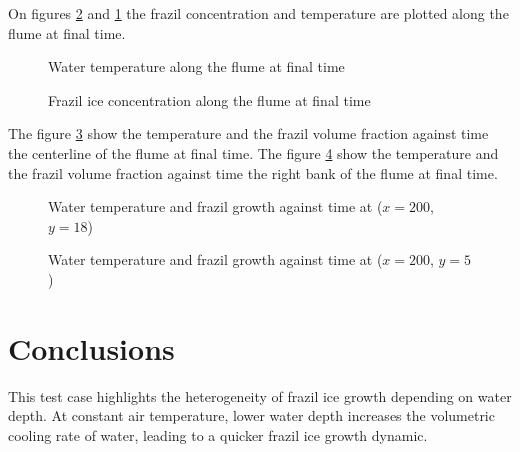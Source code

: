 On figures \ref{fig:2d_frazil} and \ref{fig:2d_temperature} the frazil concentration and temperature are plotted along the flume at final time.

\begin{figure}[H]
    \begin{center}
    \end{center}
    \caption{Water temperature along the flume at final time}
    \label{fig:2d_temperature}
\end{figure}

\begin{figure}[H]
    \begin{center}
    \end{center}
    \caption{Frazil ice concentration along the flume at final time}
    \label{fig:2d_frazil}
\end{figure}

The figure \ref{fig:growth_Cf_timeseries} show the temperature and the frazil volume fraction against time the centerline of the flume at final time.
The figure \ref{fig:growth_Cf_timeseries_rightbank} show the temperature and the frazil volume fraction against time  the right bank of the flume at final time.

\begin{figure}[H]
    \begin{center}
    \end{center}
    \caption{Water temperature and frazil growth against time at ($x=200$, $y=18$)}
    \label{fig:growth_Cf_timeseries}
\end{figure}

\begin{figure}[H]
    \begin{center}
    \end{center}
    \caption{Water temperature and frazil growth against time at ($x=200$, $y=5$)}
    \label{fig:growth_Cf_timeseries_rightbank}
\end{figure}

\section{Conclusions}

This test case highlights the heterogeneity of frazil ice growth depending on water depth. 
At constant air temperature, lower water depth increases the volumetric cooling rate of water, 
leading to a quicker frazil ice growth dynamic.

\renewcommand{\labelitemi}{\textbullet}
